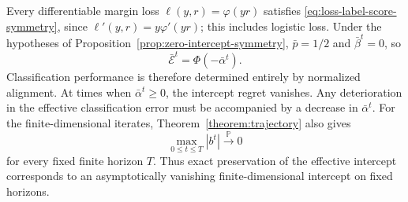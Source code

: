 Every differentiable margin loss
$\ell(y,r)=\varphi(yr)$ satisfies
\eqref{eq:loss-label-score-symmetry}, since
$\ell'(y,r)=y\varphi'(yr)$; this includes logistic loss.
Under the hypotheses of
Proposition~\ref{prop:zero-intercept-symmetry},
$\bar p=1/2$ and $\bar\beta^t=0$, so
\begin{equation}
    \bar{\mathcal E}^t=\Phi(-\bar\alpha^t).
    \label{eq:symmetric-classification-error}
\end{equation}
Classification performance is therefore determined entirely
by normalized alignment. At times when $\bar\alpha^t\geq0$,
the intercept regret vanishes. Any deterioration in the
effective classification error must be accompanied by a
decrease in $\bar\alpha^t$.
For the finite-dimensional iterates,
Theorem~\ref{theorem:trajectory} also gives
\[
    \max_{0\leq t\leq T}|b^t|
    \xrightarrow{\mathbb P}0
\]
for every fixed finite horizon $T$.
Thus exact preservation of the effective intercept corresponds
to an asymptotically vanishing finite-dimensional intercept
on fixed horizons.
